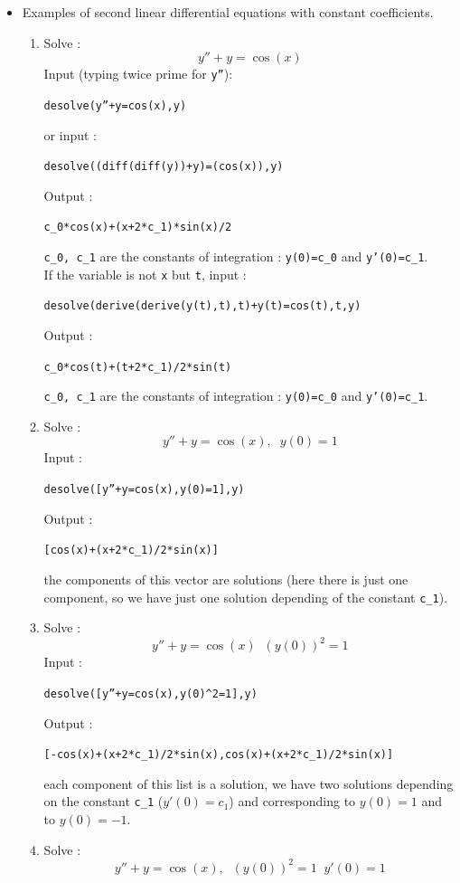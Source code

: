\documentclass[a4paper,11pt]{book}
\begin{document}
\begin{itemize}
\item Examples of second linear differential equations with constant 
coefficients.
\begin{enumerate}
\item 
Solve :
$$y''+y=\cos (x) $$
Input (typing twice prime for {\tt y''}): 
\begin{center}{\tt desolve(y''+y=cos(x),y)}\end{center}
or input :
\begin{center}{\tt desolve((diff(diff(y))+y)=(cos(x)),y)}\end{center}
Output :
\begin{center}{\tt  c\_0*cos(x)+(x+2*c\_1)*sin(x)/2}\end{center}
{\tt c\_0, c\_1} are the constants  of integration : {\tt y(0)=c\_0} and 
{\tt y'(0)=c\_1}.\\ 
If the variable is not {\tt x} but {\tt t}, input : 
\begin{center}
{\tt desolve(derive(derive(y(t),t),t)+y(t)=cos(t),t,y)}
\end{center}
Output :
\begin{center}{\tt  c\_0*cos(t)+(t+2*c\_1)/2*sin(t)}\end{center}
{\tt c\_0, c\_1} are the constants of integration : {\tt y(0)=c\_0} and
{\tt y'(0)=c\_1}.
\item
Solve :
$$y''+y=\cos (x), \; \; y(0)=1 $$
Input :
\begin{center}{\tt desolve([y''+y=cos(x),y(0)=1],y)}\end{center}
Output   :
\begin{center}{\tt [cos(x)+(x+2*c\_1)/2*sin(x)]}\end{center}
the components of this vector are solutions (here there is just one component, 
so we have just one solution depending of the constant {\tt c\_1}).
\item
Solve :
$$y''+y=\cos (x) \; \; (y(0))^2=1 $$
Input :
\begin{center}{\tt desolve([y''+y=cos(x),y(0)\verb|^|2=1],y)}\end{center}
Output :
\begin{center}{\tt [-cos(x)+(x+2*c\_1)/2*sin(x),cos(x)+(x+2*c\_1)/2*sin(x)]}\end{center}
each component of this list is a solution, 
we have two solutions depending
on the constant {\tt c\_1} ($y'(0)=c_1$)
and corresponding to $y(0)=1$ and to $y(0)=-1$.
\item
Solve :
$$y''+y=\cos (x), \; \; (y(0))^2=1 \; \; y'(0)=1$$

\end{enumerate}
\end{itemize}
\end{document}
